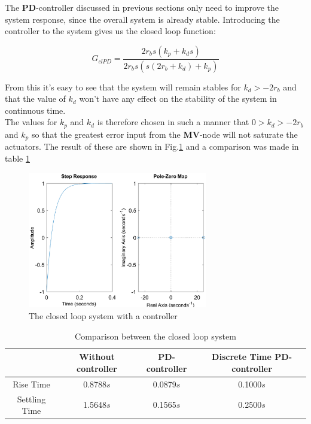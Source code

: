 \noindent The \textbf{PD}-controller discussed in previous sections only need to improve the system response, since the overall system is already stable. Introducing the controller to the system gives us the closed loop function:

\begin{equation}
    G_{clPD} = \frac{2r_b s(k_p + k_d s)}{2r_b s(s(2r_b+k_d)+k_p)}
\end{equation}

\noindent From this it's easy to see that the system will remain stables for $k_d > - 2 r_b$ and that the value of $k_d$ won't have any effect on the stability of the system in continuous time.\\
\indent The values for $k_p$ and $k_d$ is therefore chosen in such a manner that $ 0 > k_d > -2 r_b$ and $k_p$ so that the greatest error input from the \textbf{MV}-node will not saturate the actuators. The result of these are shown in Fig.\ref{fig:step2} and a comparison was made in table \ref{tab:with_without}

\begin{figure}[H]
    \centering
    \includegraphics[width= 0.7\textwidth]{img/closed_loop_step_PD.eps}
    \caption{The closed loop system with a controller}
    \label{fig:step2}
\end{figure}

\begin{table}[H]
    \centering
    \begin{tabular}{|c|ccc|}
        \hline & Without controller & \textbf{PD}-controller & Discrete Time \textbf{PD}-controller \\
        \hline Rise Time & 0.8788$s$ & 0.0879$s$ & 0.1000$s$ \\ 
        Settling Time & 1.5648$s$ & 0.1565$s$ & 0.2500$s$ \\
        \hline
    \end{tabular}
    \caption{Comparison between the closed loop system}
    \label{tab:with_without}
\end{table}


